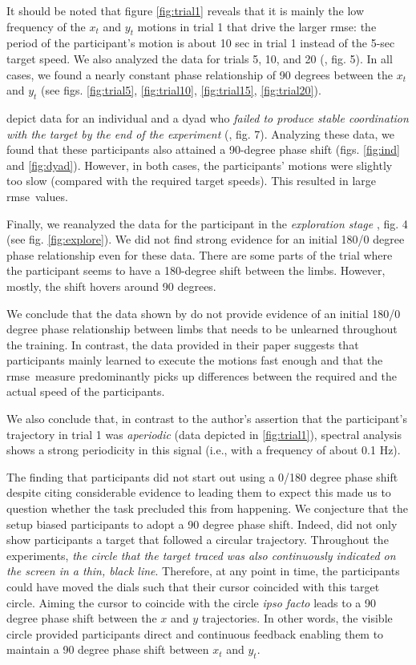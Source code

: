 \documentclass[11pt]{article}
\newcommand{\rmse}{\gls{rmse}}
\newcommand{\myquote}[1]{\textit{#1}}
\newcommand{\fg}[1]{\citet{Annand2020}, fig. #1}
\begin{document}
It should be noted that figure \ref{fig:trial1} reveals that it is mainly the low frequency of the $x_t$ and $y_t$ motions in trial 1 that drive the larger \rmse: the period of the participant's motion is about 10 sec in trial 1 instead of the 5-sec target speed. We also analyzed the data for trials 5, 10, and 20 (\fg{5}). In all cases, we found a nearly constant phase relationship of  90 degrees between the $x_t$ and $y_t$ (see figs. \ref{fig:trial5}, \ref{fig:trial10}, \ref{fig:trial15}, \ref{fig:trial20}).



\citet{Annand2020} depict data for an individual and a dyad who \myquote{failed to produce stable coordination with the target by the end of the experiment} (\fg{7}). Analyzing these data, we found that these participants also attained a 90-degree phase shift (figs. \ref{fig:ind} and \ref{fig:dyad}). However, in both cases, the participants' motions were slightly too slow (compared with the required target speeds). This resulted in large \rmse\ values.

Finally, we reanalyzed the data for the participant in the \myquote{exploration stage} \fg{4} (see fig. \ref{fig:explore}). We did not find strong evidence for an initial 180/0 degree phase relationship even for these data. There are some parts of the trial where the participant seems to have a 180-degree shift between the limbs. However, mostly, the shift hovers around 90 degrees. 

We conclude that the data shown by \citep{Annand2020} do not provide evidence of an initial 180/0 degree phase relationship between limbs that needs to be unlearned throughout the training. In contrast, the data provided in their paper suggests that participants mainly learned to execute the motions fast enough and that the \rmse\ measure predominantly picks up differences between the required and the actual speed of the participants. 

We also conclude that, in contrast to the author's assertion that the participant's trajectory in trial 1 was \myquote{aperiodic} (data depicted in \ref{fig:trial1}), spectral analysis shows a strong periodicity in this signal (i.e., with a frequency of about 0.1 Hz).

The finding that participants did not start out using a 0/180 degree phase shift despite \citet{Annand2020} citing considerable evidence to leading them to expect this made us to question whether the task precluded this from happening. We conjecture that the setup biased participants to adopt a 90 degree phase shift. Indeed, \citet{Annand2020} did not only show participants a target that followed a circular trajectory. Throughout the experiments, \myquote{the circle that the target traced was also continuously indicated on the screen in a thin, black line}. Therefore, at any point in time, the participants could have moved the dials such that their cursor coincided with this target circle. Aiming the cursor to coincide with the circle \textit{ipso facto} leads to a 90 degree phase shift between the $x$ and $y$ trajectories. In other words, the visible circle provided participants direct and continuous feedback enabling them to maintain a 90 degree phase shift between $x_t$ and $y_t$. 
\end{document}
